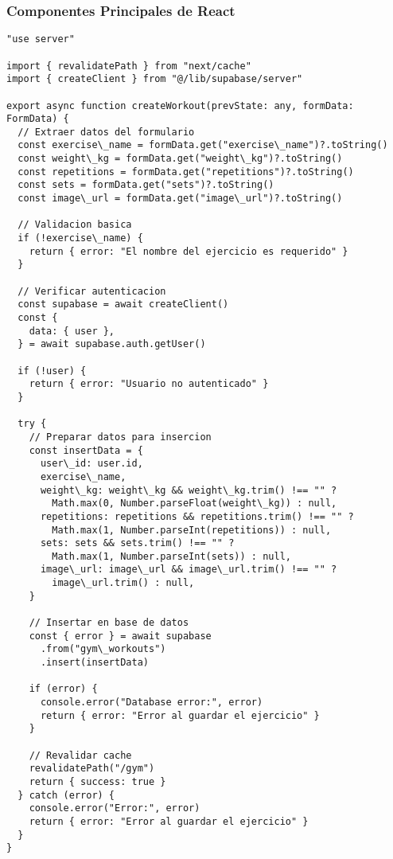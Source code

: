 \documentclass[12pt,a4paper]{article}
\begin{document}
\subsubsection{Componentes Principales de React}

\begin{lstlisting}[caption=Funcion createWorkout completa]
"use server"

import { revalidatePath } from "next/cache"
import { createClient } from "@/lib/supabase/server"

export async function createWorkout(prevState: any, formData: FormData) {
  // Extraer datos del formulario
  const exercise\_name = formData.get("exercise\_name")?.toString()
  const weight\_kg = formData.get("weight\_kg")?.toString()
  const repetitions = formData.get("repetitions")?.toString()
  const sets = formData.get("sets")?.toString()
  const image\_url = formData.get("image\_url")?.toString()

  // Validacion basica
  if (!exercise\_name) {
    return { error: "El nombre del ejercicio es requerido" }
  }

  // Verificar autenticacion
  const supabase = await createClient()
  const {
    data: { user },
  } = await supabase.auth.getUser()

  if (!user) {
    return { error: "Usuario no autenticado" }
  }

  try {
    // Preparar datos para insercion
    const insertData = {
      user\_id: user.id,
      exercise\_name,
      weight\_kg: weight\_kg && weight\_kg.trim() !== "" ? 
        Math.max(0, Number.parseFloat(weight\_kg)) : null,
      repetitions: repetitions && repetitions.trim() !== "" ? 
        Math.max(1, Number.parseInt(repetitions)) : null,
      sets: sets && sets.trim() !== "" ? 
        Math.max(1, Number.parseInt(sets)) : null,
      image\_url: image\_url && image\_url.trim() !== "" ? 
        image\_url.trim() : null,
    }

    // Insertar en base de datos
    const { error } = await supabase
      .from("gym\_workouts")
      .insert(insertData)

    if (error) {
      console.error("Database error:", error)
      return { error: "Error al guardar el ejercicio" }
    }

    // Revalidar cache
    revalidatePath("/gym")
    return { success: true }
  } catch (error) {
    console.error("Error:", error)
    return { error: "Error al guardar el ejercicio" }
  }
}
\end{lstlisting}
\end{document}
